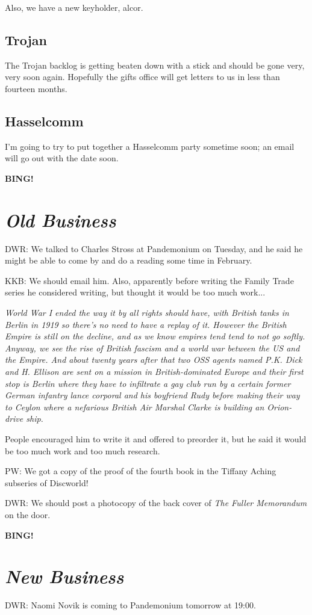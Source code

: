 \documentclass[10pt]{article}
\newcommand{\bing}{{\bf BING!} }
\newcommand{\goto}[1]{\bing \vskip 12pt \section*{{\em{#1}}}}
\begin{document}
Also, we have a new keyholder, alcor.

\subsection*{Trojan}

The Trojan backlog is getting beaten down with a stick and should be gone
very, very soon again.  Hopefully the gifts office will get letters to
us in less than fourteen months.

\subsection*{Hasselcomm}

I'm going to try to put together a Hasselcomm party sometime soon; an email
will go out with the date soon.

\goto{Old Business}

DWR: We talked to Charles Stross at Pandemonium on Tuesday, and he said he
might be able to come by and do a reading some time in February.

KKB: We should email him.  Also, apparently before writing the Family
Trade series he considered writing, but thought it would be too much
work...

\emph{World War I ended the way it by all rights should have, with British
tanks in Berlin in 1919 so there's no need to have a replay of it.  However
the British Empire is still on the decline, and as we know empires tend tend
to not go softly.  Anyway, we see the rise of British fascism and a world war
between the US and the Empire.  And about twenty years after that two OSS
agents named P.K. Dick and H. Ellison are sent on a mission in 
British-dominated Europe and their first stop is Berlin where they have
to infiltrate a gay club run by a certain former German infantry lance
corporal and his boyfriend Rudy before making their way to Ceylon where
a nefarious British Air Marshal Clarke is building an Orion-drive ship.}

People encouraged him to write it and offered to preorder it, but he
said it would be too much work and too much research.

PW: We got a copy of the proof of the fourth book in the Tiffany Aching 
subseries of Discworld!

DWR: We should post a photocopy of the back cover of \emph{The Fuller
Memorandum} on the door.

\goto{New Business}

DWR: Naomi Novik is coming to Pandemonium tomorrow at 19:00.
\end{document}
